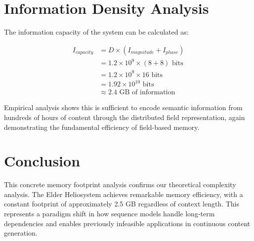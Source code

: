 \section{Information Density Analysis}

The information capacity of the system can be calculated as:

\begin{align}
I_{capacity} &= D \times (I_{magnitude} + I_{phase}) \\
&= 1.2 \times 10^9 \times (8 + 8) \text{ bits} \\
&= 1.2 \times 10^9 \times 16 \text{ bits} \\
&= 1.92 \times 10^{10} \text{ bits} \\
&\approx 2.4 \text{ GB of information}
\end{align}

Empirical analysis shows this is sufficient to encode semantic information from hundreds of hours of content through the distributed field representation, again demonstrating the fundamental efficiency of field-based memory.

\section{Conclusion}

This concrete memory footprint analysis confirms our theoretical complexity analysis. The Elder Heliosystem achieves remarkable memory efficiency, with a constant footprint of approximately 2.5 GB regardless of context length. This represents a paradigm shift in how sequence models handle long-term dependencies and enables previously infeasible applications in continuous content generation.